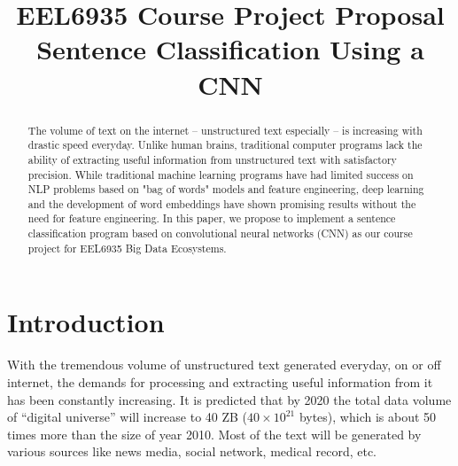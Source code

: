 \documentclass[conference]{IEEEtran}
\begin{document}
\title{EEL6935 Course Project Proposal \\
    Sentence Classification Using a CNN}
\author{
}

\maketitle

\begin{abstract}
    The volume of text on the internet -- unstructured text especially --
    is increasing with drastic speed everyday. Unlike
    human brains, traditional computer programs lack the ability of extracting
    useful information from unstructured text with satisfactory precision. 
    While traditional machine learning programs have had limited success
    on NLP problems based on "bag of words" models and feature engineering, 
    deep learning and the development of word embeddings have shown 
    promising results without the need for feature engineering. In this paper, 
    we propose to implement a sentence classification program based on 
    convolutional neural networks (CNN) as our course project for 
    EEL6935 Big Data Ecosystems. 
\end{abstract}

\IEEEpeerreviewmaketitle

\section{Introduction}
    With the tremendous volume of unstructured text generated everyday, on or off 
    internet, the demands for processing and extracting useful information 
    from it has been constantly increasing. It is predicted that by 2020 the 
    total data volume of ``digital universe'' will increase to 40 ZB 
    ($40\times 10^{21}$ bytes), which is about 50 times more than the size of 
    year 2010\cite{gantz2012digital}. Most of the text will be generated by various 
    sources like news media, social network, medical record, etc.
    
\end{document}
